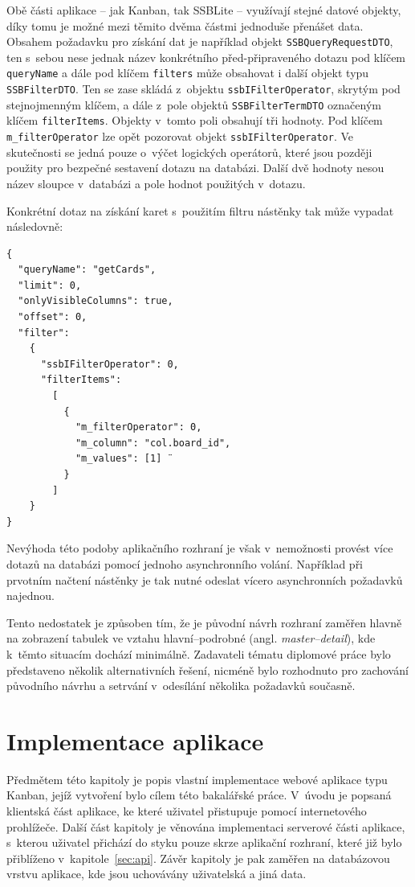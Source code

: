 Obě části aplikace -- jak Kanban, tak SSBLite -- využívají stejné datové objekty, díky tomu je možné mezi těmito dvěma částmi jednoduše přenášet data. Obsahem požadavku pro získání dat je například objekt \texttt{SSBQueryRequestDTO}, ten s~sebou nese jednak název konkrétního před-připraveného dotazu pod klíčem \texttt{queryName} a dále pod klíčem \texttt{filters} může obsahovat i další objekt typu \texttt{SSBFilterDTO}. Ten se zase skládá z~objektu \texttt{ssbIFilterOperator}, skrytým pod stejnojmenným klíčem, a dále z~pole objektů \texttt{SSBFilterTermDTO} označeným klíčem \texttt{filterItems}. Objekty v~tomto poli obsahují tři hodnoty. Pod klíčem \texttt{m\_filterOperator} lze opět pozorovat objekt \texttt{ssbIFilterOperator}. Ve skutečnosti se jedná pouze o~výčet logických operátorů, které jsou později použity pro bezpečné sestavení dotazu na databázi. Další dvě hodnoty nesou název sloupce v~databázi a pole hodnot použitých v~dotazu.

Konkrétní dotaz na získání karet s~použitím filtru nástěnky tak může vypadat následovně:

\begin{verbatim}
{
  "queryName": "getCards",
  "limit": 0,
  "onlyVisibleColumns": true,
  "offset": 0,
  "filter":
    {
      "ssbIFilterOperator": 0,
      "filterItems":
        [
          {
            "m_filterOperator": 0,
            "m_column": "col.board_id",
            "m_values": [1] ¨
          }
        ]
    }
}
\end{verbatim}

Nevýhoda této podoby aplikačního rozhraní je však v~nemožnosti provést více dotazů na databázi pomocí jednoho asynchronního volání. Například při prvotním načtení nástěnky je tak nutné odeslat vícero asynchronních požadavků najednou.

Tento nedostatek je způsoben tím, že je původní návrh rozhraní zaměřen hlavně na zobrazení tabulek ve vztahu hlavní--podrobné (angl. \emph{master--detail}), kde k~těmto situacím dochází minimálně. Zadavateli tématu diplomové práce bylo představeno několik alternativních řešení, nicméně bylo rozhodnuto pro zachování původního návrhu a setrvání v~odesílání několika požadavků současně. 

\chapter{Implementace aplikace}
Předmětem této kapitoly je popis vlastní implementace webové aplikace typu Kanban, jejíž vytvoření bylo cílem této bakalářské práce. V~úvodu je popsaná klientská část aplikace, ke které uživatel přistupuje pomocí internetového prohlížeče. Další část kapitoly je věnována implementaci serverové části aplikace, s~kterou uživatel přichází do styku pouze skrze aplikační rozhraní, které již bylo přiblíženo v~kapitole~\ref{sec:api}. Závěr kapitoly je pak zaměřen na databázovou vrstvu aplikace, kde jsou uchovávány uživatelská a jiná data.



